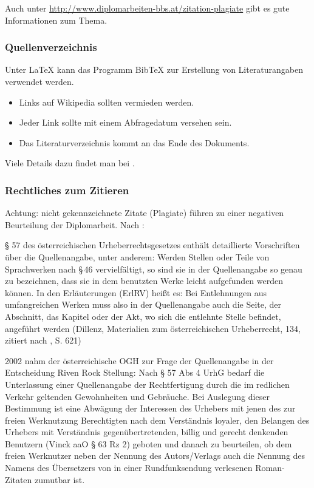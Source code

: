 Auch unter \url{http://www.diplomarbeiten-bbs.at/zitation-plagiate}
gibt es gute Informationen zum Thema.


\subsubsection{Quellenverzeichnis}

Unter \LaTeX{} kann das Programm Bib\TeX{} zur Erstellung von Literaturangaben
verwendet werden. 
\begin{itemize}
\item Links auf Wikipedia sollten vermieden werden.\nopagebreak
\item Jeder Link sollte mit einem Abfragedatum versehen sein.\nopagebreak
\item Das Literaturverzeichnis kommt an das Ende des Dokuments.\nopagebreak
\end{itemize}
Viele Details dazu findet man bei \citep{wiki:zitat}.


\subsubsection{Rechtliches zum Zitieren}

Achtung: nicht gekennzeichnete Zitate (Plagiate) führen zu einer negativen
Beurteilung der Diplomarbeit. Nach \citep{wiki:quelle}:

§ 57 des österreichischen Urheberrechtsgesetzes\citep{ris57} enthält
detaillierte Vorschriften über die Quellenangabe, unter anderem: Werden
Stellen oder Teile von Sprachwerken nach §\,46 vervielfältigt, so
sind sie in der Quellenangabe so genau zu bezeichnen, dass sie in
dem benutzten Werke leicht aufgefunden werden können. In den Erläuterungen
(ErlRV) heißt es: Bei Entlehnungen aus umfangreichen Werken muss also
in der Quellenangabe auch die Seite, der Abschnitt, das Kapitel oder
der Akt, wo sich die entlehnte Stelle befindet, angeführt werden (Dillenz,
Materialien zum österreichischen Urheberrecht, 134, zitiert nach \citep{dittrich},
S. 621)

2002 nahm der österreichische OGH zur Frage der Quellenangabe in der
Entscheidung Riven Rock Stellung: Nach § 57 Abs 4 UrhG bedarf die
Unterlassung einer Quellenangabe der Rechtfertigung durch die im redlichen
Verkehr geltenden Gewohnheiten und Gebräuche. Bei Auslegung dieser
Bestimmung ist eine Abwägung der Interessen des Urhebers mit jenen
des zur freien Werknutzung Berechtigten nach dem Verständnis loyaler,
den Belangen des Urhebers mit Verständnis gegenübertretenden, billig
und gerecht denkenden Benutzern (Vinck aaO § 63 Rz 2) geboten und
danach zu beurteilen, ob dem freien Werknutzer neben der Nennung des
Autors/Verlags auch die Nennung des Namens des Übersetzers von in
einer Rundfunksendung verlesenen Roman-Zitaten zumutbar ist.



